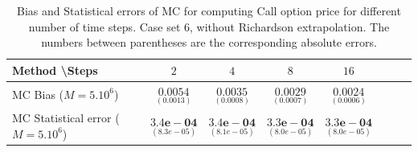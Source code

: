 \documentclass[11pt]{article}
\begin{document}
\begin{table}[h!]
	\centering
	\begin{tabular}{l*{6}{c}r}
		Method \textbackslash  Steps            & $2$ & $4$ & $8$ & $16$  \\
		\hline
		MC Bias ($M=5.10^6$)   & 	$ \underset{(    0.0013)}{\mathbf{0.0054}}$  & $\underset{(0.0008)}{\mathbf{0.0035
		}}$  & $\underset{(0.0007)}{\mathbf{0.0029}}$ & $\underset{(0.0006)}{\mathbf{0.0024}}$\\ 
		
		MC Statistical error ($M=5.10^6$)  &  $\underset{(   8.3e-05)} {\mathbf{3.4e-04}}$  & $\underset{(8.1e-05)} {\mathbf{3.4e-04}}$  & $\underset{(8.0e-05)} {\mathbf{3.3e-04 }}$ & $\underset{(8.0e-05)} {\mathbf{3.3e-04}}$	\\
		
		\hline
	\end{tabular}
	\caption{Bias and Statistical errors of MC   for computing Call option price  for different number of time steps. Case set 6, without Richardson extrapolation. The numbers between parentheses are the corresponding absolute errors.}
	\label{Bias and Statistical errors of MC ($M=5.10^6$)  for computing Call option price  for different number of time steps. Case set 6, without Richardson extrapolation. The numbers between parentheses are the corresponding absolute errors.}
\end{table}
\end{document}
